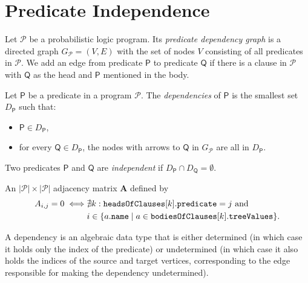 \documentclass[runningheads]{llncs}
\newcommand{\variable}[1]{\texttt{\textup{#1}}}
\newcommand{\predicates}{\mathcal{P}}
\begin{document}
\section{Predicate Independence}

\begin{definition}
  Let $\mathscr{P}$ be a probabilistic logic program. Its \emph{predicate
    dependency graph} is a directed graph $G_{\mathscr{P}} = (V, E)$ with the
  set of nodes $V$ consisting of all predicates in $\mathscr{P}$. We add an edge
  from predicate $\mathsf{P}$ to predicate $\mathsf{Q}$ if there is a clause in
  $\mathscr{P}$ with $\mathsf{Q}$ as the head and $\mathsf{P}$ mentioned in the
  body.
\end{definition}

\begin{definition}
  Let $\mathsf{P}$ be a predicate in a program $\mathscr{P}$. The
  \emph{dependencies} of $\mathsf{P}$ is the smallest set $D_{\mathsf{P}}$ such
  that:
  \begin{itemize}
  \item $\mathsf{P} \in D_{\mathsf{P}}$,
  \item for every $\mathsf{Q} \in D_{\mathsf{P}}$, the nodes with arrows to
    $\mathsf{Q}$ in $G_{\mathscr{P}}$ are all in $D_{\mathsf{P}}$.
  \end{itemize}
\end{definition}

\begin{definition}
  Two predicates $\mathsf{P}$ and $\mathsf{Q}$ are \emph{independent} if
  $D_{\mathsf{P}} \cap D_{\mathsf{Q}} = \emptyset$.
\end{definition}

\begin{definition}
  An $|\predicates{}| \times |\predicates{}|$ adjacency matrix $\mathbf{A}$
  defined by
  \begin{align*}
    A_{i,j} = 0 \iff &\nexists k: \variable{headsOfClauses}[k].\variable{predicate} = j \text{ and } \\
    &i \in \{ a.\variable{name} \mid a \in \variable{bodiesOfClauses}[k].\variable{treeValues} \}.
  \end{align*}
\end{definition}

A dependency is an algebraic data type that is either determined (in which case
it holds only the index of the predicate) or undetermined (in which case it also
holds the indices of the source and target vertices, corresponding to the edge
responsible for making the dependency undetermined).
\end{document}
